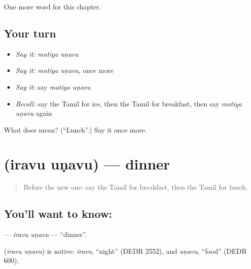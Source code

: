 \begin{grammarlens}[title={What you've built}]
One more word for this chapter.
\end{grammarlens}

\subsection*{Your turn}
\begin{itemize}
\raggedright
  \item \emph{Say it:} \emph{matiya uṇavu}
  \item \emph{Say it:} \emph{matiya uṇavu}, once more
  \item \emph{Say it:} say \emph{matiya uṇavu}
  \item \emph{Recall:} say the Tamil for ice, then the Tamil for breakfast, then say \emph{matiya uṇavu} again
\end{itemize}

\begin{tcolorbox}[breakable,colback=teal!4,colframe=teal!35!black,title={Before you move on}]
What does   mean? (\textquotedblleft{}Lunch\textquotedblright{}.) Say it once more.
\end{tcolorbox}
\section[\texorpdfstring{\ta{இரவு} \ta{உணவு} (iravu uṇavu)}{இரவு உணவு (iravu uṇavu)}]{  (iravu uṇavu) — dinner}

\label{lesson:TA-C184-iravu-unavu}



\begin{quote}
Before the new one: say the Tamil for breakfast, then the Tamil for lunch.
\end{quote}

\subsection*{You'll want to know:  }
\textbf{ } — \emph{iravu uṇavu} — \textquotedblleft{}dinner\textquotedblright{}.

\begin{cousinweb}
\textbf{ } (\emph{iravu uṇavu}) is native: \emph{iravu}, \textquotedblleft{}night\textquotedblright{} (DEDR 2552), and \emph{uṇavu}, \textquotedblleft{}food\textquotedblright{} (DEDR 600).
\end{cousinweb}

